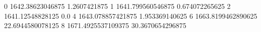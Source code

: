 0 1642.38623046875 1.2607421875
1 1641.799560546875 0.674072265625
2 1641.12548828125 0.0
4 1643.078857421875 1.953369140625
6 1663.8199462890625 22.6944580078125
8 1671.4925537109375 30.3670654296875
